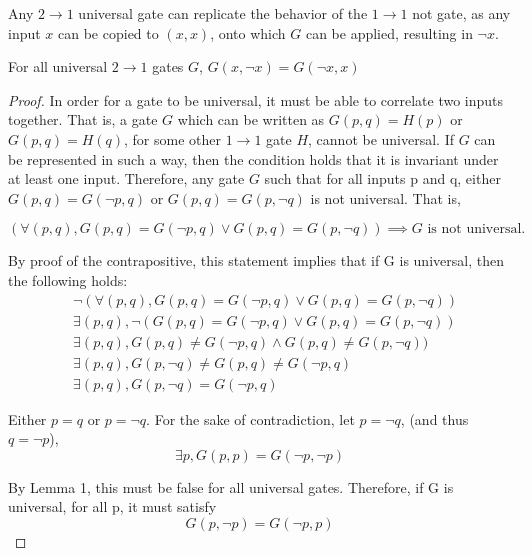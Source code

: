 \documentclass[12pt]{article}
\begin{document}
\begin{corollary}
    Any $2 \to 1$ universal gate can replicate the behavior of the $1 \to 1$ not gate, as any input $x$ can be copied to $(x, x)$, onto which $G$ can be applied, resulting in $\neg x$.
\end{corollary}

\begin{lemma}
    For all universal $2 \to 1$ gates $G$,
    $G(x, \neg x) = G(\neg x, x)$
\end{lemma}

\begin{proof}
	In order for a gate to be universal, it must be able to correlate two inputs together. That is, a gate $G$ which can be written as $G(p, q) = H(p)$ or $G(p, q) = H(q)$, for some other $1 \to 1$ gate $H$, cannot be universal. If $G$ can be represented in such a way, then the condition holds that it is invariant under at least one input. Therefore, any gate $G$ such that for all inputs p and q, either $G(p, q) = G(\neg p, q)$ or $G(p, q) = G(p, \neg q)$ is not universal. That is,

    $$(\forall (p, q), G(p, q) = G(\neg p, q) \lor G(p, q) = G(p, \neg q)) \implies G \text{ is not universal.}$$

    By proof of the contrapositive, this statement implies that if G is universal, then the following holds:
    \begin{align}
        &\neg (\forall (p, q), G(p, q) = G(\neg p, q) \lor G(p, q) = G(p, \neg q)) \\
        &\exists (p, q), \neg (G(p, q) = G(\neg p, q) \lor G(p, q) = G(p, \neg q)) \\
        &\exists (p, q), G(p, q) \ne G(\neg p, q) \land G(p, q) \ne G(p, \neg q)) \\
        &\exists (p, q), G(p, \neg q) \ne G(p, q) \ne G(\neg p, q) \\
        &\exists (p, q), G(p, \neg q) = G(\neg p, q)
    \end{align}

    Either $p = q$ or $p = \neg q$. For the sake of contradiction, let $p = \neg q$, (and thus $q = \neg p$),
    $$\exists p, G(p, p) = G(\neg p, \neg p)$$

    By Lemma 1, this must be false for all universal gates. Therefore, if G is universal, for all p, it must satisfy
    $$G(p, \neg p) = G(\neg p, p)$$
\end{proof}
\end{document}
